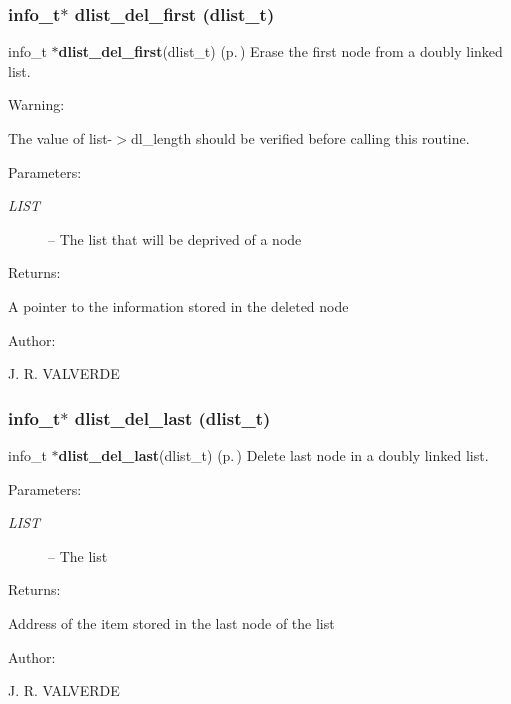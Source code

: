 \subsubsection{\setlength{\rightskip}{0pt plus 5cm}info\_\-t$\ast$ dlist\_\-del\_\-first ({\bf dlist\_\-t})}\label{P__dlist_8h_a4}


info\_\-t $\ast${\bf dlist\_\-del\_\-first}(dlist\_\-t) {\rm (p.\,\pageref{P__dlist_8h_a4})} Erase the first node from a doubly linked list.

\begin{Desc}
\item[Warning: ]\par
The value of list-$>$dl\_\-length should be verified before calling this routine. \end{Desc}
\begin{Desc}
\item[Parameters: ]\par
\begin{description}
\item[{\em 
LIST}]-- The list that will be deprived of a node \end{description}
\end{Desc}
\begin{Desc}
\item[Returns: ]\par
A pointer to the information stored in the deleted node\end{Desc}
\begin{Desc}
\item[Author: ]\par
J. R. VALVERDE \end{Desc}
\subsubsection{\setlength{\rightskip}{0pt plus 5cm}info\_\-t$\ast$ dlist\_\-del\_\-last ({\bf dlist\_\-t})}\label{P__dlist_8h_a6}


info\_\-t $\ast${\bf dlist\_\-del\_\-last}(dlist\_\-t) {\rm (p.\,\pageref{P__dlist_8h_a6})} Delete last node in a doubly linked list.

\begin{Desc}
\item[Parameters: ]\par
\begin{description}
\item[{\em 
LIST}]-- The list \end{description}
\end{Desc}
\begin{Desc}
\item[Returns: ]\par
Address of the item stored in the last node of the list\end{Desc}
\begin{Desc}
\item[Author: ]\par
J. R. VALVERDE \end{Desc}
